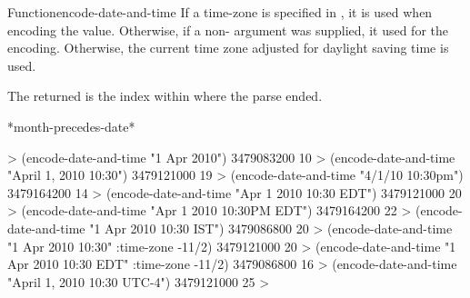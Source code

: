 \documentclass[10pt,twoside,english,pdftex]{article}
\begin{document}
\begin{functiondoc}{Function}{encode-date-and-time}
If a time-zone is specified in , it is used when encoding the
 value.  Otherwise, if a non-\nil{}
 argument was supplied, it used for the encoding.
Otherwise, the current time zone adjusted for daylight saving time is used.

The returned  is the index within  where the
parse ended.

\begin{alsos}{*month-precedes-date*}
\end{alsos}

\fnexamples
%
\W\supp
\begin{example}
  > (encode-date-and-time "1 Apr 2010")
  3479083200
  10\goodpagebreak
  > (encode-date-and-time "April 1, 2010 10:30")
  3479121000
  19\goodpagebreak
  > (encode-date-and-time "4/1/10 10:30pm")
  3479164200
  14\goodpagebreak
  > (encode-date-and-time "Apr 1 2010 10:30 EDT")
  3479121000
  20\goodpagebreak
  > (encode-date-and-time "Apr 1 2010 10:30PM EDT")
  3479164200
  22\goodpagebreak
  > (encode-date-and-time "1 Apr 2010 10:30 IST")
  3479086800
  20\goodpagebreak
  > (encode-date-and-time "1 Apr 2010 10:30" :time-zone -11/2)
  3479121000
  20\goodpagebreak
  > (encode-date-and-time "1 Apr 2010 10:30 EDT" :time-zone -11/2)
  3479086800
  16\goodpagebreak
  > (encode-date-and-time "April 1, 2010 10:30 UTC-4")
  3479121000
  25
  >
\end{example}

\end{functiondoc}

\end{document}
